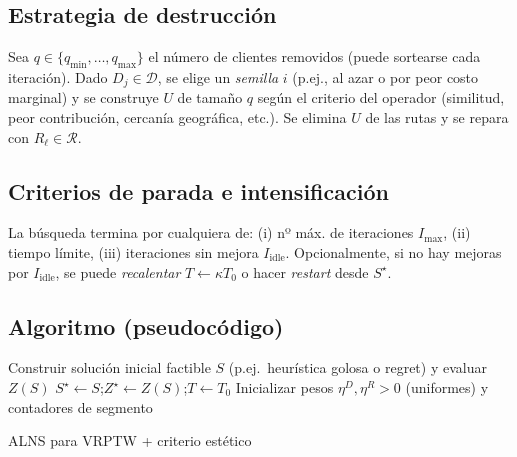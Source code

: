 \documentclass[11pt, a4paper]{article}
\begin{document}
\subsection{Estrategia de destrucción}
Sea $q\in\{q_{\min},\dots,q_{\max}\}$ el número de clientes removidos (puede sortearse cada iteración). Dado $D_j\in\mathcal{D}$, se elige un \emph{semilla} $i$ (p.ej., al azar o por peor costo marginal) y se construye $U$ de tamaño $q$ según el criterio del operador (similitud, peor contribución, cercanía geográfica, etc.). Se elimina $U$ de las rutas y se repara con $R_\ell\in\mathcal{R}$.

\subsection{Criterios de parada e intensificación}
La búsqueda termina por cualquiera de: (i) nº máx. de iteraciones $I_{\max}$, (ii) tiempo límite, (iii) iteraciones sin mejora $I_{\text{idle}}$. Opcionalmente, si no hay mejoras por $I_{\text{idle}}$, se puede \emph{recalentar} $T\leftarrow \kappa T_0$ o hacer \emph{restart} desde $S^\star$.

\subsection{Algoritmo (pseudocódigo)}
\begin{algorithm}[H]
\DontPrintSemicolon
\SetAlgoLined


Construir solución inicial factible $S$ (p.ej.\ heurística golosa o regret) y evaluar $Z(S)$\;
$S^\star\leftarrow S$;\quad $Z^\star\leftarrow Z(S)$;\quad $T\leftarrow T_0$\;
Inicializar pesos $\eta^D,\eta^R>0$ (uniformes) y contadores de segmento\;

\;
\caption{ALNS para VRPTW + criterio estético}
\end{algorithm}
\end{document}
